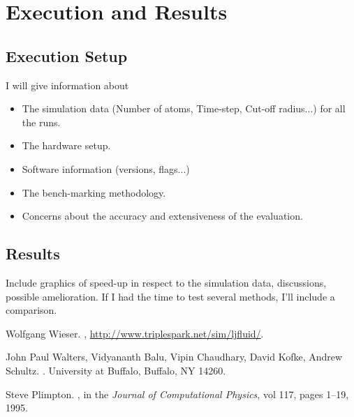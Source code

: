 \documentclass[a4wide,12pt]{article}
\begin{document}
\section{Execution and Results}
\subsection{Execution Setup}
I will give information about
\begin{itemize}
    \item The simulation data (Number of atoms, Time-step, Cut-off radius...) for all the runs.
    \item The hardware setup.
    \item Software information (versions, flags...)
    \item The bench-marking methodology.
    \item Concerns about the accuracy and extensiveness of the evaluation.
\end{itemize}

\subsection{Results}
Include graphics of speed-up in respect to the simulation data, discussions, possible amelioration. If I had the time
to test several methods, I'll include a comparison.



\begin{thebibliography}{10}

Wolfgang Wieser.
,
\newblock \url{http://www.triplespark.net/sim/ljfluid/}.

John Paul Walters, Vidyananth Balu, 
Vipin Chaudhary, David Kofke, Andrew Schultz.
.
\newblock University at Buffalo, Buffalo, NY 14260.

Steve Plimpton.
,
\newblock in the {\em Journal of Computational Physics}, vol 117, pages 1--19, 1995.




\end{thebibliography}
\end{document}

